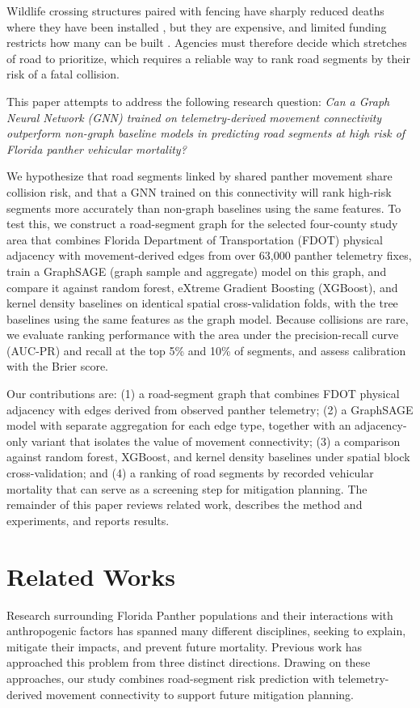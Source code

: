 \documentclass[letterpaper]{article}
\begin{document}
Wildlife crossing structures paired with fencing have sharply reduced deaths where they have been installed \cite{fwc2025crossings}, but they are expensive, and limited funding restricts how many can be built \cite{Loraamm2016}. Agencies must therefore decide which stretches of road to prioritize, which requires a reliable way to rank road segments by their risk of a fatal collision.

This paper attempts to address the following research question: \textit{Can a Graph Neural Network (GNN) trained on telemetry-derived movement connectivity outperform non-graph baseline models in predicting road segments at high risk of Florida panther vehicular mortality?}

We hypothesize that road segments linked by shared panther movement share collision risk, and that a GNN trained on this connectivity will rank high-risk segments more accurately than non-graph baselines using the same features. To test this, we construct a road-segment graph for the selected four-county study area that combines Florida Department of Transportation (FDOT) physical adjacency with movement-derived edges from over 63,000 panther telemetry fixes, train a GraphSAGE (graph sample and aggregate) model on this
graph, and compare it against random forest, eXtreme Gradient Boosting (XGBoost), and kernel density baselines on identical spatial cross-validation folds, with the tree baselines using the same features as the graph model. Because collisions are rare, we evaluate ranking performance with the area under the precision-recall curve (AUC-PR) and recall at the top 5\% and 10\% of segments, and assess calibration with the Brier score.

Our contributions are: (1) a road-segment graph that combines FDOT physical adjacency with edges derived from observed panther telemetry; (2) a GraphSAGE model with separate aggregation for each edge type, together with an adjacency-only variant that isolates the value of movement connectivity; (3) a comparison against random forest, XGBoost, and kernel density baselines under spatial block cross-validation; and (4) a ranking of road segments by recorded vehicular mortality that can serve as a screening step for mitigation planning. The remainder of this paper reviews related work, describes the method and experiments, and reports results.



\section{Related Works}
Research surrounding Florida Panther populations and their interactions with anthropogenic factors has spanned many different disciplines, seeking to explain, mitigate their impacts, and prevent future mortality. Previous work has approached this problem from three distinct directions. Drawing on these approaches, our study combines road-segment risk prediction with telemetry-derived movement connectivity to support future mitigation planning.
\end{document}
